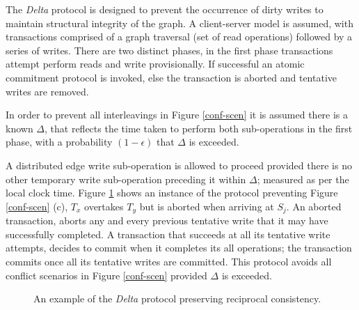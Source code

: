 \documentclass[sigplan,10pt]{acmart}
\begin{document}
The \emph{Delta} protocol is designed to prevent the occurrence of dirty writes to maintain structural integrity of the graph. A client-server model is assumed, with transactions comprised of a graph traversal (set of read operations) followed by a series of writes. There are two distinct phases, in the first phase transactions attempt perform reads and write provisionally. If successful an atomic commitment protocol is invoked, else the transaction is aborted and tentative writes are removed.

In order to prevent all interleavings in Figure \ref{conf-scen} it is assumed there is a known $\Delta$, that reflects the time taken to perform both sub-operations in the first phase, with a probability $(1-\epsilon)$ that $\Delta$ is exceeded.

A distributed edge write sub-operation is allowed to proceed provided there is no other temporary write sub-operation preceding it within $\Delta$; measured as per the local clock time. Figure \ref{delta-abort} shows an instance of the protocol preventing Figure \ref{conf-scen} (c), $T_x$ overtakes $T_y$ but is aborted when arriving at $S_j$. An aborted transaction, aborts any and every previous tentative write that it may have successfully completed. A transaction that succeeds at all its tentative write attempts, decides to commit when it completes its all operations; the transaction commits once all its tentative writes are committed. This protocol avoids all conflict scenarios in Figure \ref{conf-scen} provided $\Delta$ is exceeded.

\begin{figure}[H]
  \centering
  \caption{An example of the \emph{Delta} protocol preserving reciprocal consistency.}
  \label{delta-abort}
\end{figure}
\end{document}
